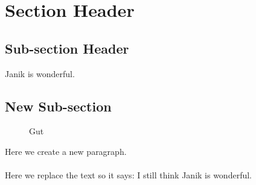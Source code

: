 \section{Section Header}

\subsection{Sub-section Header}

Janik is wonderful.

\subsection{New Sub-section}

\begin{figure}[ht!]
\centering
{}
\caption{Gut}
\end{figure}
\noindent
Here we create a new paragraph. \\ \\
Here we replace the text so it says: I still think Janik is wonderful.